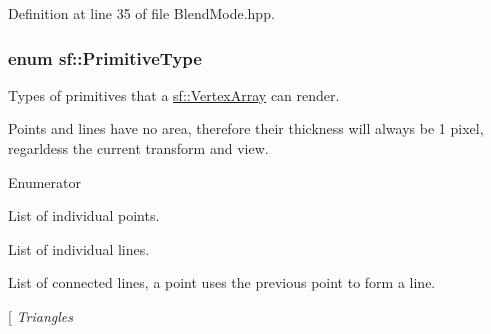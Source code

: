 Definition at line 35 of file Blend\-Mode.\-hpp.

\hypertarget{group__graphics_ga5ee56ac1339984909610713096283b1b}{
\subsubsection[{Primitive\-Type}]{\setlength{\rightskip}{0pt plus 5cm}enum {\bf sf\-::\-Primitive\-Type}}}\label{group__graphics_ga5ee56ac1339984909610713096283b1b}


Types of primitives that a \hyperlink{classsf_1_1_vertex_array}{sf\-::\-Vertex\-Array} can render. 

Points and lines have no area, therefore their thickness will always be 1 pixel, regarldess the current transform and view. \begin{Desc}
\item[Enumerator]\par
\begin{description}
\item[{\em 
\hypertarget{group__graphics_gga5ee56ac1339984909610713096283b1bac7097d3e01778b9318def1f7ac35a785}{Points}\label{group__graphics_gga5ee56ac1339984909610713096283b1bac7097d3e01778b9318def1f7ac35a785}
}]List of individual points. \item[{\em 
\hypertarget{group__graphics_gga5ee56ac1339984909610713096283b1ba2bf015eeff9f798dfc3d6d744d669f1e}{Lines}\label{group__graphics_gga5ee56ac1339984909610713096283b1ba2bf015eeff9f798dfc3d6d744d669f1e}
}]List of individual lines. \item[{\em 
\hypertarget{group__graphics_gga5ee56ac1339984909610713096283b1ba5b09910f5d0f39641342184ccd0d1de3}{Lines\-Strip}\label{group__graphics_gga5ee56ac1339984909610713096283b1ba5b09910f5d0f39641342184ccd0d1de3}
}]List of connected lines, a point uses the previous point to form a line. \item[{\em 
\hypertarget{group__graphics_gga5ee56ac1339984909610713096283b1ba880a7aa72c20b9f9beb7eb64d2434670}{Triangles}\label{group__graphics_gga5ee56ac1339984909610713096283b1ba880a7aa72c20b9f9beb7eb64d2434670}
}
\end{description}
\end{Desc}
